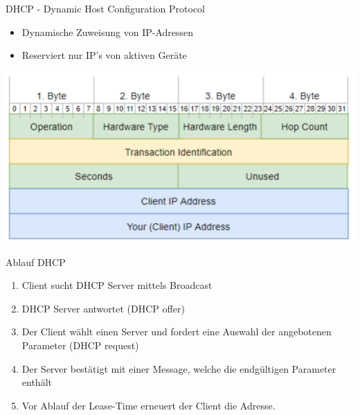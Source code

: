 \begin{definition}{DHCP - Dynamic Host Configuration Protocol}
    \begin{itemize}
        \item Dynamische Zuweisung von IP-Adressen
        \item Reserviert nur IP’s von aktiven Geräte
    \end{itemize}
    \includegraphics[width=1\linewidth]{images/bootp.png}
\end{definition}

\begin{KR}{Ablauf DHCP}
    \begin{enumerate}
        \item Client sucht DHCP Server mittels Broadcast
        \item DHCP Server antwortet (DHCP offer)
        \item Der Client wählt einen Server und fordert eine Auswahl der angebotenen Parameter (DHCP request)
        \item Der Server bestätigt mit einer Message, welche die endgültigen Parameter enthält
        \item Vor Ablauf der Lease-Time erneuert der Client die Adresse.
    \end{enumerate}
\end{KR}

